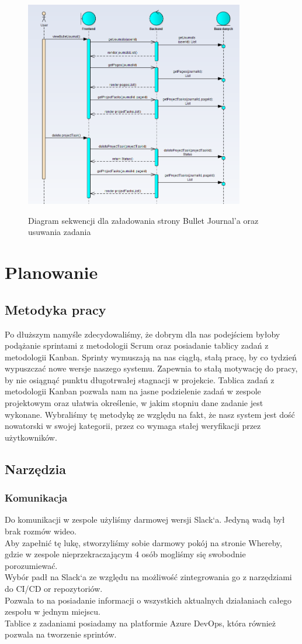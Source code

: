 \documentclass[a4paper,11pt]{report}
\begin{document}
\begin{figure}[h]
	\centering
	\includegraphics[width=\textwidth, height=9cm]{sekwencji1.png}\\
	\caption{Diagram sekwencji dla załadowania strony Bullet Journal’a oraz usuwania zadania}
	\label{fig:seq2}
\end{figure}
\chapter {Planowanie}
\section{Metodyka pracy}
Po dłuższym namyśle zdecydowaliśmy, że dobrym dla nas podejściem byłoby podążanie sprintami z metodologii Scrum
 oraz posiadanie tablicy zadań z metodologii Kanban\cite{agile}.
 Sprinty wymuszają na nas ciągłą, stałą pracę, by co tydzień wypuszczać nowe wersje naszego systemu.
 Zapewnia to stałą motywację do pracy, by nie osiągnąć punktu długotrwałej stagnacji w projekcie.
 Tablica zadań z metodologii Kanban pozwala nam na jasne podzielenie zadań w zespole projektowym
 oraz ułatwia określenie, w jakim stopniu dane zadanie jest wykonane.
 Wybraliśmy tę metodykę ze względu na fakt, że nasz system jest dość nowatorski w swojej kategorii,
 przez co wymaga stałej weryfikacji przez użytkowników.
\section{Narzędzia}
\subsection {Komunikacja}
Do komunikacji w zespole użyliśmy darmowej wersji Slack`a. Jedyną wadą był brak rozmów wideo.\\
Aby zapełnić tę lukę, stworzyliśmy sobie darmowy pokój na stronie Whereby, gdzie w zespole nieprzekraczającym 4
osób mogliśmy się swobodnie porozumiewać.\\
Wybór padł na Slack`a ze względu na możliwość zintegrowania go z narzędziami do CI/CD or repozytoriów.\\
Pozwala to na posiadanie informacji o wszystkich aktualnych działaniach całego zespołu w jednym miejscu.\\
Tablice z zadaniami posiadamy na platformie Azure DevOps, która również pozwala na tworzenie sprintów.\\
\end{document}
